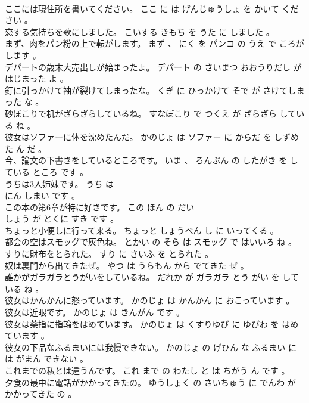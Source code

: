 \documentclass[8pt]{extreport}
\begin{document}
\begin{CJK}{UTF8}{min}
\\	ここには現住所を書いてください。	ここ に は げんじゅうしょ を かいて ください 。 
\\	恋する気持ちを歌にしました。	こいする きもち を うた に しました 。 
\\	まず、肉をパン粉の上で転がします。	まず 、 にく を パンコ の うえ で ころがします 。 
\\	デパートの歳末大売出しが始まったよ。	デパート の さいまつ おおうりだし が はじまった よ 。 
\\	釘に引っかけて袖が裂けてしまったな。	くぎ に ひっかけて そで が さけてしまった な 。 
\\	砂ぼこりで机がざらざらしているね。	すなぼこり で つくえ が ざらざら している ね 。 
\\	彼女はソファーに体を沈めたんだ。	かのじょ は ソファー に からだ を しずめた ん だ 。 
\\	今、論文の下書きをしているところです。	いま 、 ろんぶん の したがき を している ところ です 。 
\\	うちは3人姉妹です。	うち は 
\\	にん しまい です 。 
\\	この本の第6章が特に好きです。	この ほん の だい 
\\	しょう が とくに すき です 。 
\\	ちょっと小便しに行って来る。	ちょっと しょうべん し に いってくる 。 
\\	都会の空はスモッグで灰色ね。	とかい の そら は スモッグ で はいいろ ね 。 
\\	すりに財布をとられた。	すり に さいふ を とられた 。 
\\	奴は裏門から出てきたぜ。	やつ は うらもん から でてきた ぜ 。 
\\	誰かがガラガラとうがいをしているね。	だれか が ガラガラ とう がい を している ね 。 
\\	彼女はかんかんに怒っています。	かのじょ は かんかん に おこっています 。 
\\	彼女は近眼です。	かのじょ は きんがん です 。 
\\	彼女は薬指に指輪をはめています。	かのじょ は くすりゆび に ゆびわ を はめています 。 
\\	彼女の下品なふるまいには我慢できない。	かのじょ の げひん な ふるまい に は がまん できない 。 
\\	これまでの私とは違うんです。	これ まで の わたし と は ちがう ん です 。 
\\	夕食の最中に電話がかかってきたの。	ゆうしょく の さいちゅう に でんわ が かかってきた の 。 

\end{CJK}
\end{document}
